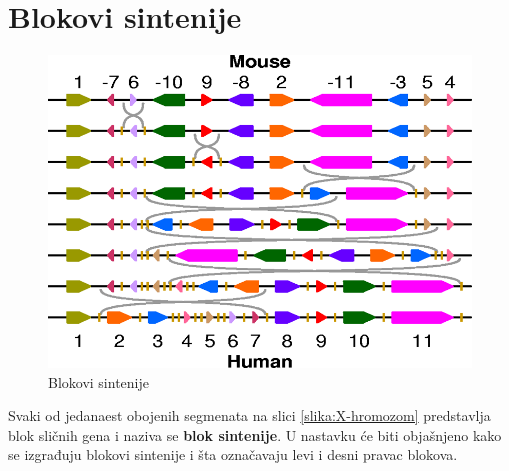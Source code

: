 \section{Blokovi sintenije}


\begin{figure}[h!]
\centering
\includegraphics[scale=0.7]{poglavlja/6/slike/transformacija.png}
\caption{Blokovi sintenije}
\label{slika:transformacija}
\end{figure}

Svaki od jedanaest obojenih segmenata na slici \ref{slika:X-hromozom} predstavlja blok sličnih gena i naziva se \textbf{blok sintenije}. U nastavku će biti objašnjeno kako se izgrađuju blokovi sintenije i šta označavaju levi i desni pravac blokova.


